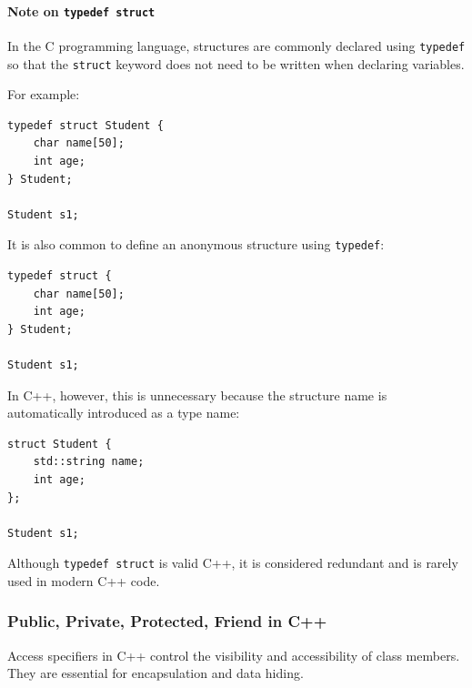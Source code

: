 \documentclass[10pt]{article}
\begin{document}
\newpage

\paragraph{Note on \texttt{typedef struct}}

In the C programming language, structures are commonly declared using
\verb|typedef| so that the \verb|struct| keyword does not need to be written
when declaring variables.

For example:

\begin{verbatim}
typedef struct Student {
    char name[50];
    int age;
} Student;

Student s1;
\end{verbatim}

It is also common to define an anonymous structure using \verb|typedef|:

\begin{verbatim}
typedef struct {
    char name[50];
    int age;
} Student;

Student s1;
\end{verbatim}

In C++, however, this is unnecessary because the structure name is
automatically introduced as a type name:

\begin{verbatim}
struct Student {
    std::string name;
    int age;
};

Student s1;
\end{verbatim}

Although \verb|typedef struct| is valid C++, it is considered redundant and is
rarely used in modern C++ code.

\newpage
\subsubsection{Public, Private, Protected, Friend in C++}

Access specifiers in C++ control the visibility and accessibility of class members. They are essential for encapsulation and data hiding.
\end{document}

